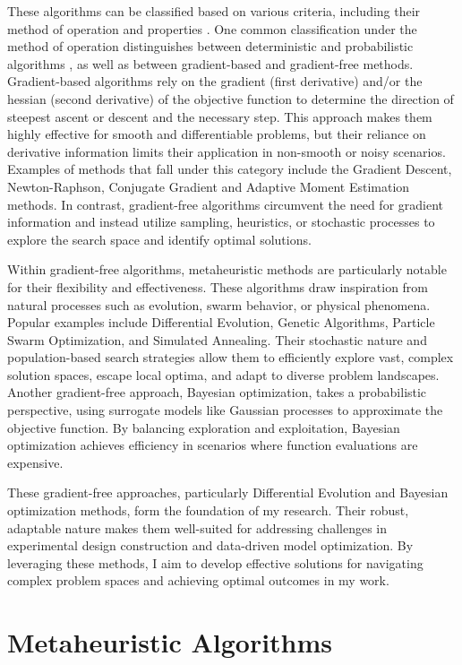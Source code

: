 These algorithms can be classified based on various criteria, including their method of operation and properties \parencite{weise2009global}. One common classification under the method of operation distinguishes between deterministic and probabilistic algorithms \parencite{weise2009global}, as well as between gradient-based and gradient-free methods. Gradient-based algorithms rely on the gradient (first derivative) and/or the hessian (second derivative) of the objective function to determine the direction of steepest ascent or descent and the necessary step. This approach makes them highly effective for smooth and differentiable problems, but their reliance on derivative information limits their application in non-smooth or noisy scenarios. Examples of methods that fall under this category include the Gradient Descent, Newton-Raphson, Conjugate Gradient and Adaptive Moment Estimation methods. In contrast, gradient-free algorithms circumvent the need for gradient information and instead utilize sampling, heuristics, or stochastic processes to explore the search space and identify optimal solutions.

Within gradient-free algorithms, metaheuristic methods are particularly notable for their flexibility and effectiveness. These algorithms draw inspiration from natural processes such as evolution, swarm behavior, or physical phenomena. Popular examples include Differential Evolution, Genetic Algorithms, Particle Swarm Optimization, and Simulated Annealing. Their stochastic nature and population-based search strategies allow them to efficiently explore vast, complex solution spaces, escape local optima, and adapt to diverse problem landscapes. Another gradient-free approach, Bayesian optimization, takes a probabilistic perspective, using surrogate models like Gaussian processes to approximate the objective function. By balancing exploration and exploitation, Bayesian optimization achieves efficiency in scenarios where function evaluations are expensive.

These gradient-free approaches, particularly Differential Evolution and Bayesian optimization methods, form the foundation of my research. Their robust, adaptable nature makes them well-suited for addressing challenges in experimental design construction and data-driven model optimization. By leveraging these methods, I aim to develop effective solutions for navigating complex problem spaces and achieving optimal outcomes in my work.

\section{Metaheuristic Algorithms}

